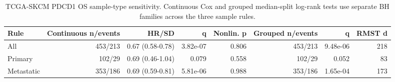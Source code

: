 \begin{table}[t]
\centering
\footnotesize
\caption{TCGA-SKCM PDCD1 OS sample-type sensitivity. Continuous Cox and grouped median-split log-rank tests use separate BH families across the three sample rules.}
\label{tab:skcm-pdcd1-sample-rule-sensitivity}
\begin{tabular}{lrrrrrrr}
\toprule
Rule & Continuous n/events & HR/SD & q & Nonlin. p & Grouped n/events & q & RMST d \\
\midrule
All & 453/213 & 0.67 (0.58-0.78) & 3.82e-07 & 0.806 & 453/213 & 9.48e-06 & 218 \\
Primary & 102/29 & 0.69 (0.46-1.04) & 0.079 & 0.558 & 102/29 & 0.052 & 83 \\
Metastatic & 353/186 & 0.69 (0.59-0.81) & 5.81e-06 & 0.988 & 353/186 & 1.65e-04 & 173 \\
\bottomrule
\end{tabular}
\end{table}
